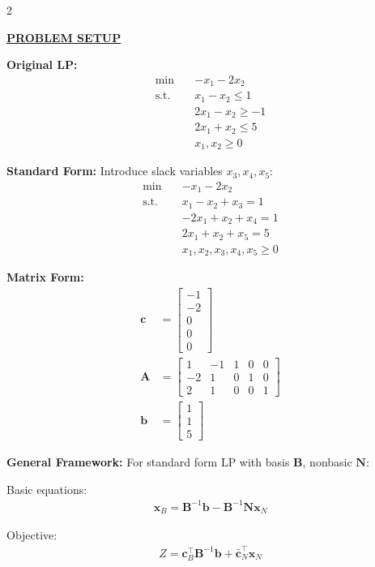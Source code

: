 \documentclass[10pt,a4paper]{article}
\newcommand{\mysection}[1]{\vspace{3pt}\textbf{\underline{#1}}\vspace{2pt}}
\newcommand{\mysubsection}[1]{\vspace{2pt}\textbf{#1:}\vspace{1pt}}
\newcommand{\mb}[1]{\mathbf{#1}}
\begin{document}
\begin{multicols}{2}

\mysection{PROBLEM SETUP}

\mysubsection{Original LP}
\begin{align*}
\min \quad & -x_1 - 2x_2 \\
\text{s.t.} \quad & x_1 - x_2 \leq 1 \\
& 2x_1 - x_2 \geq -1 \\
& 2x_1 + x_2 \leq 5 \\
& x_1, x_2 \geq 0
\end{align*}

\mysubsection{Standard Form}
Introduce slack variables $x_3, x_4, x_5$:
\begin{align*}
\min \quad & -x_1 - 2x_2 \\
\text{s.t.} \quad & x_1 - x_2 + x_3 = 1 \\
& -2x_1 + x_2 + x_4 = 1 \\
& 2x_1 + x_2 + x_5 = 5 \\
& x_1, x_2, x_3, x_4, x_5 \geq 0
\end{align*}

\mysubsection{Matrix Form}
\begin{align*}
\mb{c} &= \begin{bmatrix} -1 \\ -2 \\ 0 \\ 0 \\ 0 \end{bmatrix} \\
\mb{A} &= \begin{bmatrix} 
1 & -1 & 1 & 0 & 0 \\
-2 & 1 & 0 & 1 & 0 \\
2 & 1 & 0 & 0 & 1
\end{bmatrix} \\
\mb{b} &= \begin{bmatrix} 1 \\ 1 \\ 5 \end{bmatrix}
\end{align*}

\mysubsection{General Framework}
For standard form LP with basis $\mb{B}$, nonbasic $\mb{N}$:

Basic equations:
\begin{align}
\mb{x}_B = \mb{B}^{-1}\mb{b} - \mb{B}^{-1}\mb{N}\mb{x}_N \tag{1}
\end{align}

Objective:
\begin{align}
Z = \mb{c}_B^\top\mb{B}^{-1}\mb{b} + \bar{\mb{c}}_N^\top\mb{x}_N \tag{2}
\end{align}


\end{multicols}
\end{document}
